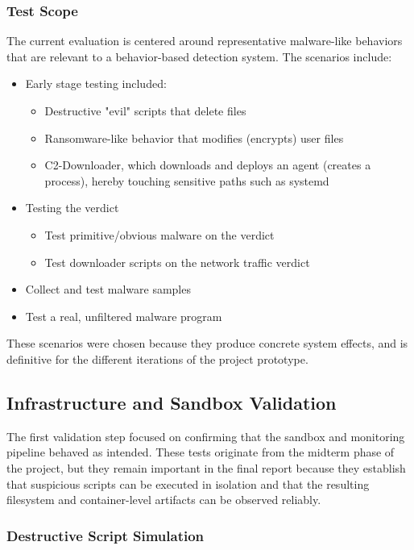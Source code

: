 \subsubsection{Test Scope}
\noindent
The current evaluation is centered around representative malware-like behaviors that are relevant to a behavior-based detection system. The scenarios include:
\begin{itemize}
    \item Early stage testing included:
    \begin{itemize}
        \item Destructive "evil" scripts that delete files
        \item Ransomware-like behavior that modifies (encrypts) user files 
        \item C2-Downloader, which downloads and deploys an agent (creates a process), hereby touching sensitive paths such as systemd
    \end{itemize}
    \item Testing the verdict
    \begin{itemize}
        \item Test primitive/obvious malware on the verdict
        \item Test downloader scripts on the network traffic verdict
    \end{itemize}
    \item Collect and test malware samples
    \item Test a real, unfiltered malware program 
\end{itemize}
\noindent
These scenarios were chosen because they produce concrete system effects, and is definitive for the different iterations of the project prototype.

\newpage

\subsection{Infrastructure and Sandbox Validation}
\noindent
The first validation step focused on confirming that the sandbox and monitoring pipeline behaved as intended. These tests originate from the midterm phase of the project, but they remain important in the final report because they establish that suspicious scripts can be executed in isolation and that the resulting filesystem and container-level artifacts can be observed reliably.

\subsubsection{Destructive Script Simulation}

